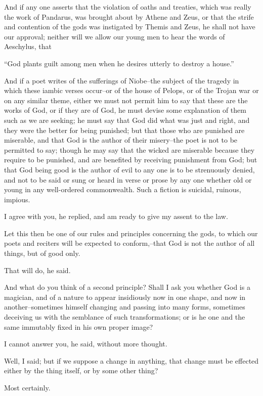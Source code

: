 And if any one asserts that the violation of oaths and treaties, which
was really the work of Pandarus, was brought about by Athene and Zeus,
or that the strife and contention of the gods was instigated by Themis
and Zeus, he shall not have our approval; neither will we allow our
young men to hear the words of Aeschylus, that

``God plants guilt among men when he desires utterly to destroy a house.''

And if a poet writes of the sufferings of Niobe--the subject of the
tragedy in which these iambic verses occur--or of the house of Pelops,
or of the Trojan war or on any similar theme, either we must not permit
him to say that these are the works of God, or if they are of God, he
must devise some explanation of them such as we are seeking; he must say
that God did what was just and right, and they were the better for being
punished; but that those who are punished are miserable, and that God
is the author of their misery--the poet is not to be permitted to say;
though he may say that the wicked are miserable because they require
to be punished, and are benefited by receiving punishment from God;
but that God being good is the author of evil to any one is to be
strenuously denied, and not to be said or sung or heard in verse or
prose by any one whether old or young in any well-ordered commonwealth.
Such a fiction is suicidal, ruinous, impious.

I agree with you, he replied, and am ready to give my assent to the law.

Let this then be one of our rules and principles concerning the gods, to
which our poets and reciters will be expected to conform,--that God is
not the author of all things, but of good only.

That will do, he said.

And what do you think of a second principle? Shall I ask you whether God
is a magician, and of a nature to appear insidiously now in one shape,
and now in another--sometimes himself changing and passing into
many forms, sometimes deceiving us with the semblance of such
transformations; or is he one and the same immutably fixed in his own
proper image?

I cannot answer you, he said, without more thought.

Well, I said; but if we suppose a change in anything, that change must
be effected either by the thing itself, or by some other thing?

Most certainly.

